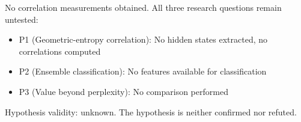 No correlation measurements obtained. All three research questions remain untested:

\begin{itemize}
\item P1 (Geometric-entropy correlation): No hidden states extracted, no correlations computed
\item P2 (Ensemble classification): No features available for classification
\item P3 (Value beyond perplexity): No comparison performed
\end{itemize}

Hypothesis validity: unknown. The hypothesis is neither confirmed nor refuted.
